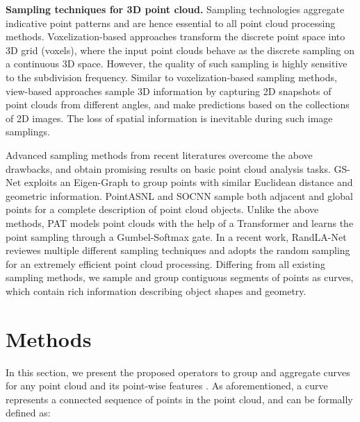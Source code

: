 \documentclass[10pt,twocolumn,letterpaper]{article}
\theoremstyle{definition}
\begin{document}
\noindent
\textbf{Sampling techniques for 3D point cloud.} Sampling technologies aggregate indicative point patterns and are hence essential to all point cloud processing methods. Voxelization-based approaches \cite{qi2016volumetric, wu2016learning, wu20153d, maturana2015voxnet} transform the discrete point space into 3D grid (voxels), where the input point clouds behave as the discrete sampling on a continuous 3D space. However, the quality of such sampling is highly sensitive to the subdivision frequency. Similar to voxelization-based sampling methods, view-based approaches \cite{su2015multi, kanezaki2016rotationnet, xie2016deepshape} sample 3D information by capturing 2D snapshots of point clouds from different angles, and make predictions based on the collections of 2D images. The loss of spatial information is inevitable during such image samplings.

Advanced sampling methods from recent literatures overcome the above drawbacks, and obtain promising results on basic point cloud analysis tasks. GS-Net \cite{xu2020geometry} exploits an Eigen-Graph to group points with similar Euclidean distance and geometric information. PointASNL \cite{yan2020pointasnl} and SOCNN \cite{zhang2020shape} sample both adjacent and global points for a complete description of point cloud objects. Unlike the above methods, PAT \cite{yang2019modeling} models point clouds with the help of a Transformer \cite{vaswani2017attention} and learns the point sampling through a Gumbel-Softmax gate. In a recent work, RandLA-Net \cite{hu2020randla} reviewes multiple different sampling techniques and adopts the random sampling for an extremely efficient point cloud processing. Differing from all existing sampling methods, we sample and group contiguous segments of points as curves, which contain rich information describing object shapes and geometry.























\section{Methods}
In this section, we present the proposed operators to group and aggregate curves for any point cloud  and its point-wise features . As aforementioned, a curve represents a connected sequence of points in the point cloud, and can be formally defined as:
\end{document}

